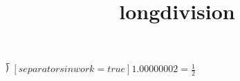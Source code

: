 \documentclass{standalone}
\title{longdivision}
\begin{document}
$\longdivision[separators in work = true ]{1.0000000}{2}=\frac{1}{2}$
\end{document}
